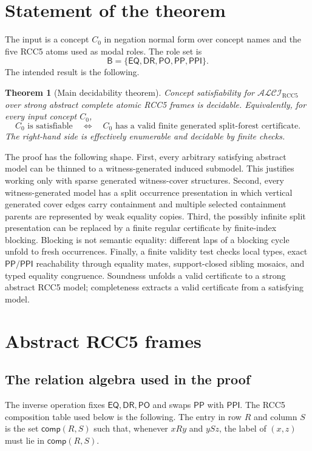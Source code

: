 \documentclass[11pt]{article}
\newtheorem{theorem}{Theorem}[section]
\newcommand{\Logic}{\mathcal{ALCI}_{\mathrm{RCC5}}}
\newcommand{\Base}{\mathsf{B}}
\newcommand{\EQ}{\mathsf{EQ}}
\newcommand{\DR}{\mathsf{DR}}
\newcommand{\PO}{\mathsf{PO}}
\newcommand{\PP}{\mathsf{PP}}
\newcommand{\PPI}{\mathsf{PPI}}
\newcommand{\comp}{\mathsf{comp}}
\begin{document}
\section{Statement of the theorem}

The input is a concept $C_0$ in negation normal form over concept names and the five RCC5 atoms used as modal roles.  The role set is
\[
  \Base=\{\EQ,\DR,\PO,\PP,\PPI\}.
\]
The intended result is the following.

\begin{theorem}[Main decidability theorem]\label{thm:main}
Concept satisfiability for $\Logic$ over strong abstract complete atomic RCC5 frames is decidable.
Equivalently, for every input concept $C_0$,
\[
  C_0 \text{ is satisfiable}
  \quad\Longleftrightarrow\quad
  C_0 \text{ has a valid finite generated split-forest certificate}.
\]
The right-hand side is effectively enumerable and decidable by finite checks.
\end{theorem}

The proof has the following shape.  First, every arbitrary satisfying abstract model can be thinned to a witness-generated induced submodel.  This justifies working only with sparse generated witness-cover structures.  Second, every witness-generated model has a split occurrence presentation in which vertical generated cover edges carry containment and multiple selected containment parents are represented by weak equality copies.  Third, the possibly infinite split presentation can be replaced by a finite regular certificate by finite-index blocking.  Blocking is not semantic equality: different laps of a blocking cycle unfold to fresh occurrences.  Finally, a finite validity test checks local types, exact $\PP/\PPI$ reachability through equality mates, support-closed sibling mosaics, and typed equality congruence.  Soundness unfolds a valid certificate to a strong abstract RCC5 model; completeness extracts a valid certificate from a satisfying model.

\section{Abstract RCC5 frames}

\subsection{The relation algebra used in the proof}

The inverse operation fixes $\EQ,\DR,\PO$ and swaps $\PP$ with $\PPI$.  The RCC5 composition table used below is the following.  The entry in row $R$ and column $S$ is the set $\comp(R,S)$ such that, whenever $xRy$ and $ySz$, the label of $(x,z)$ must lie in $\comp(R,S)$.
\end{document}
